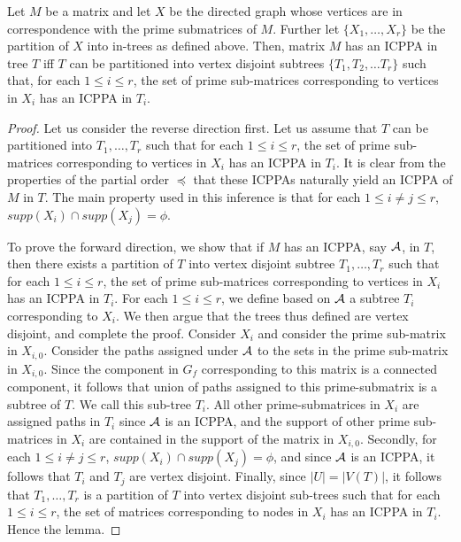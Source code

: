 \begin{lemma}
  \label{lem:subicppa}
  Let $M$ be a matrix and let $X$ be the directed graph whose vertices
  are in correspondence with the prime submatrices of $M$.  Further
  let $\{X_1,\ldots,X_r\}$ be the partition of $X$ into in-trees as
  defined above.  Then, matrix $M$ has an ICPPA in tree $T$ iff $T$
  can be partitioned into vertex disjoint subtrees $\{T_1, T_2, \dots
  T_r\}$ such that, for each $1 \leq i \leq r$, the set of prime
  sub-matrices corresponding to vertices in $X_i$ has an ICPPA in
  $T_i$.
\end{lemma}
\begin{proof}
  Let us consider the reverse direction first.  Let us assume that $T$
  can be partitioned into $T_1, \ldots, T_r$ such that for each $1
  \leq i \leq r $, the set of prime sub-matrices corresponding to
  vertices in $X_i$ has an ICPPA in $T_i$.  It is clear from the
  properties of the partial order $\preccurlyeq$ that these ICPPAs
  naturally yield an ICPPA of $M$ in $T$.  The main property used in
  this inference is that for each $1 \leq i \neq j \leq r$, $supp(X_i)
  \cap supp(X_j) = \phi$.

\noindent
To prove the forward direction, we show that if $M$ has an ICPPA, say
${\cal A}$, in $T$, then there exists a partition of $T$ into vertex
disjoint subtree $T_1, \ldots, T_r$ such that for each $1 \leq i \leq
r$, the set of prime sub-matrices corresponding to vertices in $X_i$
has an ICPPA in $T_i$.  For each $1 \leq i \leq r$, we define based on
${\cal A}$ a subtree $T_i$ corresponding to $X_i$.  We then argue that the
trees thus defined are vertex disjoint, and complete the proof.
Consider $X_i$ and consider the prime sub-matrix in $X_{i,0}$.
Consider the paths assigned under ${\cal A}$ to the sets in the prime
sub-matrix in $X_{i,0}$.  Since the component in $G_f$ corresponding
to this matrix is a connected component, it follows that union of
paths assigned to this prime-submatrix is a subtree of $T$.  We call
this sub-tree $T_i$.  All other prime-submatrices in $X_i$ are
assigned paths in $T_i$ since ${\cal A}$ is an ICPPA, and the support of
other prime sub-matrices in $X_i$ are contained in the support of the
matrix in $X_{i,0}$.  Secondly, for each $1 \leq i \neq j \leq r$,
$supp(X_i) \cap supp(X_j) = \phi$, and since ${\cal A}$ is an ICPPA, it
follows that $T_i$ and $T_j$ are vertex disjoint.  Finally, since $|U|
= |V(T)|$, it follows that $T_1, \ldots, T_r$ is a partition of $T$
into vertex disjoint sub-trees such that for each $1 \leq i \leq r$,
the set of matrices corresponding to nodes in $X_i$ has an ICPPA in
$T_i$.  Hence the lemma.
\end{proof}
